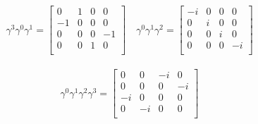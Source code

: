 \begin{align*}
\gamma^3 \gamma^0 \gamma^1 = \begin{bmatrix}
 0  &  1  &  0  &  0  \\
 -1  &  0  &  0  &  0  \\
 0  &  0  &  0  &  -1  \\
 0  &  0  &  1  &  0  \\
\end{bmatrix} \quad
\gamma^0 \gamma^1 \gamma^2 = \begin{bmatrix}
 -i  &  0  &  0  &  0  \\
 0  &  i  &  0  &  0  \\
 0  &  0  &  i  &  0  \\
 0  &  0  &  0  &  -i  \\
\end{bmatrix}
\end{align*}

\begin{align*}
\gamma^0 \gamma^1 \gamma^2 \gamma^3 = \begin{bmatrix}
 0  &  0  &  -i  &  0  \\
 0  &  0  &  0  &  -i  \\
 -i  &  0  &  0  &  0  \\
 0  &  -i  &  0  &  0  \\
\end{bmatrix}
\end{align*}



%
%


